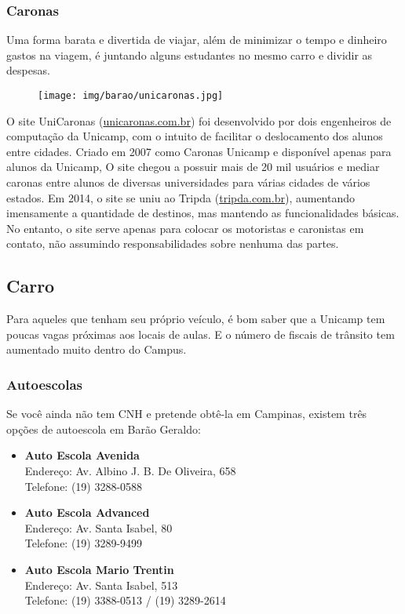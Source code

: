 \subsubsection*{Caronas}

Uma forma barata e divertida de viajar, além de minimizar o tempo e dinheiro
gastos na viagem, é juntando alguns estudantes no mesmo carro e dividir as
despesas.
\begin{figure}[h!]
    \centering
    \texttt{[image: img/barao/unicaronas.jpg]}
\end{figure}

O site UniCaronas (\url{unicaronas.com.br}) foi desenvolvido por dois
engenheiros de computação da Unicamp, com o intuito de facilitar o deslocamento
dos alunos entre cidades. Criado em 2007 como Caronas Unicamp e disponível
apenas para alunos da Unicamp, O site chegou a possuir mais de 20 mil usuários e
mediar caronas entre alunos de diversas universidades para várias cidades de
vários estados. Em 2014, o site se uniu ao Tripda (\url{tripda.com.br}),
aumentando imensamente a quantidade de destinos, mas mantendo as funcionalidades
básicas. No entanto, o site serve apenas para colocar os motoristas e caronistas
em contato, não assumindo responsabilidades sobre nenhuma das partes.

\subsection{Carro}

Para aqueles que tenham seu próprio veículo, é bom saber que a Unicamp tem
poucas vagas próximas aos locais de aulas. E o número de fiscais de trânsito tem
aumentado muito dentro do Campus.

\subsubsection*{Autoescolas}

Se você ainda não tem CNH e pretende obtê-la em Campinas, existem três opções de
autoescola em Barão Geraldo:

\begin{itemize}
    \item  \textbf{Auto Escola Avenida}
        \\Endereço: Av. Albino J. B. De Oliveira, 658
        \\Telefone: (19) 3288-0588

    \item  \textbf{Auto Escola Advanced}
        \\Endereço: Av. Santa Isabel, 80
        \\Telefone: (19) 3289-9499

    \item  \textbf{Auto Escola Mario Trentin}
        \\Endereço: Av. Santa Isabel, 513
        \\Telefone: (19) 3388-0513 / (19) 3289-2614
\end{itemize}

